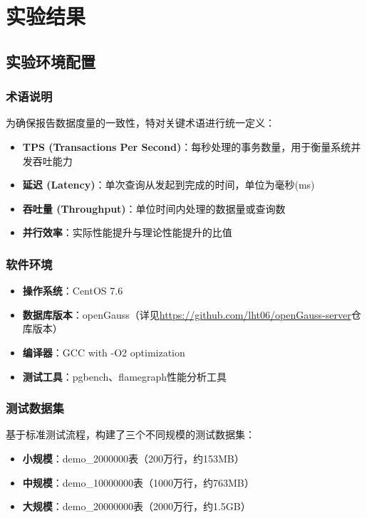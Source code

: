 \section{实验结果}

\subsection{实验环境配置}

\subsubsection{术语说明}
为确保报告数据度量的一致性，特对关键术语进行统一定义：
\begin{itemize}
    \item \textbf{TPS (Transactions Per Second)}：每秒处理的事务数量，用于衡量系统并发吞吐能力
    \item \textbf{延迟 (Latency)}：单次查询从发起到完成的时间，单位为毫秒(ms)
    \item \textbf{吞吐量 (Throughput)}：单位时间内处理的数据量或查询数
    \item \textbf{并行效率}：实际性能提升与理论性能提升的比值
\end{itemize}

\subsubsection{软件环境}
\begin{itemize}
    \item \textbf{操作系统}：CentOS 7.6
    \item \textbf{数据库版本}：openGauss（详见\url{https://github.com/lht06/openGauss-server}仓库版本）
    \item \textbf{编译器}：GCC with -O2 optimization
    \item \textbf{测试工具}：pgbench、flamegraph性能分析工具
\end{itemize}

\subsubsection{测试数据集}
基于标准测试流程，构建了三个不同规模的测试数据集：
\begin{itemize}
    \item \textbf{小规模}：demo\_2000000表（200万行，约153MB）
    \item \textbf{中规模}：demo\_10000000表（1000万行，约763MB）
    \item \textbf{大规模}：demo\_20000000表（2000万行，约1.5GB）
\end{itemize}

